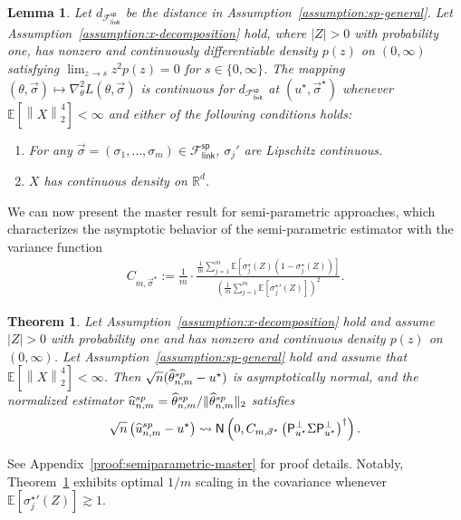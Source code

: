 \documentclass[11pt]{article}
\newcommand{\Ep}{\mathbb{E}}
\newcommand{\E}{\mathbb{E}}
\newcommand{\R}{\mathbb{R}} %
\newcommand{\prn}[1]{\left({#1}\right)} %
\newcommand{\norm}[1]{\left\|{#1}\right\|} %
\newcommand{\what}[1]{\widehat{#1}}
\newcommand{\normal}{\mathsf{N}}
\newcommand{\sem}{^{\textup{sp}}}
\newcommand{\proj}{\mathsf{P}}
\newcommand{\poploss}{L}
\newcommand{\fsymlinksp}{\mathcal{F}_{\mathsf{link}}^{\mathsf{sp}}}
\newcommand{\ltwo}[1]{\norm{#1}_2} %
\newcommand{\norms}[1]{\|{#1}\|} %
\newcommand{\ltwos}[1]{\norms{#1}_2} %
\newcommand{\<}{\langle} %
\renewcommand{\>}{\rangle}
\newcommand{\cd}{\rightsquigarrow}
\newcommand{\opt}{^\star}
\newcommand{\spe}{\what{\theta}\sem_{n,m}} %
\newtheorem{lemma}[claim]{Lemma}
\newtheorem{theorem}{Theorem}
\begin{document}
\begin{lemma} \label{lem:d-continuity-guarantees}
  Let $d_{\fsymlinksp}$ be the distance in
  Assumption~\ref{assumption:sp-general}. Let
  Assumption~\ref{assumption:x-decomposition} hold, where $|Z| > 0$ with
  probability one, has nonzero and continuously differentiable density
  $p(z)$ on $(0, \infty)$ satisfying $\lim_{z \to s} z^2 p(z) = 0$ for $s
  \in \{0, \infty\}$. The mapping $(\theta, \vec{\sigma}) \mapsto
  \nabla_\theta^2 \poploss(\theta, \vec{\sigma})$ is continuous for
  $d_{\fsymlinksp}$ at $(u\opt, \vec{\sigma}\opt)$ whenever $\Ep [\ltwo{X}^4] <
  \infty$ and either of the following conditions holds:
  \begin{enumerate}[leftmargin=2em,label=(\arabic*)]
  \item For any  $\vec{\sigma} = (\sigma_1, \ldots, \sigma_m) \in \fsymlinksp$, $\sigma_j'$ are Lipschitz continuous.
  \item $X$ has continuous density on $\R^d$.
  \end{enumerate}
\end{lemma}
We can now present the master result for semi-parametric
approaches, which characterizes the asymptotic behavior of the
semi-parametric estimator with the variance function
\begin{align*}
  C_{m, \vec{\sigma}\opt} := \frac{1}{m} \cdot
  \frac{\frac{1}{m} \sum_{j = 1}^m \E[\sigma_j\opt(Z) (1 - \sigma_j\opt(Z))]}{
    (\frac{1}{m} \sum_{j = 1}^m
    \E[{\sigma_j\opt}'(Z)])^2}.
\end{align*} 
\begin{theorem}
  \label{theorem:semiparametric-master}
  Let Assumption~\ref{assumption:x-decomposition} hold and assume $|Z| >
  0$ with probability one and has nonzero and continuous density $p(z)$ on
  $(0, \infty)$.  Let Assumption~\ref{assumption:sp-general} hold and assume
  that $\Ep [\ltwo{X}^4] < \infty$.  Then $\sqrt{n}(\spe - u\opt)$ is
  asymptotically normal, and the normalized estimator $\what{u}\sem_{n,m} =
  \spe / \ltwos{\spe}$ satisfies
	\begin{equation*}
		\sqrt{n} \prn{\what{u}\sem_{n,m} - u\opt}
		\cd \normal\prn{0, 	C_{m, \vec{\sigma}\opt}
			\prn{\proj_{u\opt}^\perp \Sigma \proj_{u\opt}^\perp}^\dagger}.
	\end{equation*}
\end{theorem}
\noindent
See Appendix~\ref{proof:semiparametric-master} for proof details.
Notably, Theorem~\ref{theorem:semiparametric-master} exhibits optimal
$1/m$ scaling in the covariance whenever $\E[{\sigma\opt_j}'(Z)] \gtrsim 1$.
\end{document}

